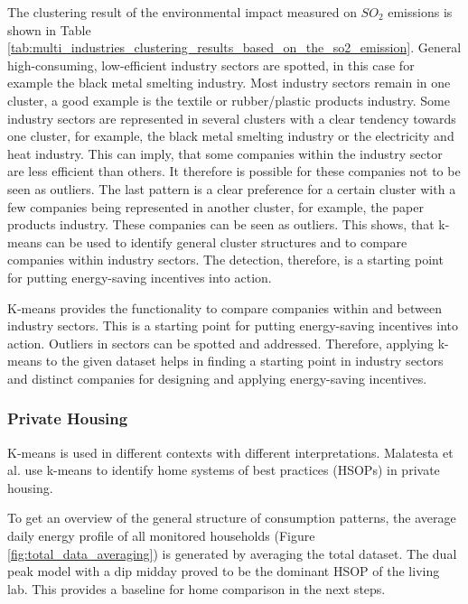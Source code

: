 The clustering result of the environmental impact measured on $SO_2$ emissions is shown in Table \ref{tab:multi_industries_clustering_results_based_on_the_so2_emission}.
General high-consuming, low-efficient industry sectors are spotted, in this case for example the black metal smelting industry.
Most industry sectors remain in one cluster, a good example is the textile or rubber/plastic products industry.
Some industry sectors are represented in several clusters with a clear tendency towards one cluster, for example, the black metal smelting industry or the electricity and heat industry.
This can imply, that some companies within the industry sector are less efficient than others.
It therefore is possible for these companies not to be seen as outliers.
The last pattern is a clear preference for a certain cluster with a few companies being represented in another cluster, for example, the paper products industry.
These companies can be seen as outliers.
This shows, that k-means can be used to identify general cluster structures and to compare companies within industry sectors.
The detection, therefore, is a starting point for putting energy-saving incentives into action.

K-means provides the functionality to compare companies within and between industry sectors.
This is a starting point for putting energy-saving incentives into action.
Outliers in sectors can be spotted and addressed.
Therefore, applying k-means to the given dataset helps in finding a starting point in industry sectors and distinct companies for designing and applying energy-saving incentives.

\subsubsection{Private Housing}
K-means is used in different contexts with different interpretations.
Malatesta et al. \cite{MAL-HBP} use k-means to identify home systems of best practices (HSOPs) in private housing.

To get an overview of the general structure of consumption patterns, the average daily energy profile of all monitored households (Figure \ref{fig:total_data_averaging}) is generated by averaging the total dataset.
The dual peak model with a dip midday proved to be the dominant HSOP of the living lab.
This provides a baseline for home comparison in the next steps.

